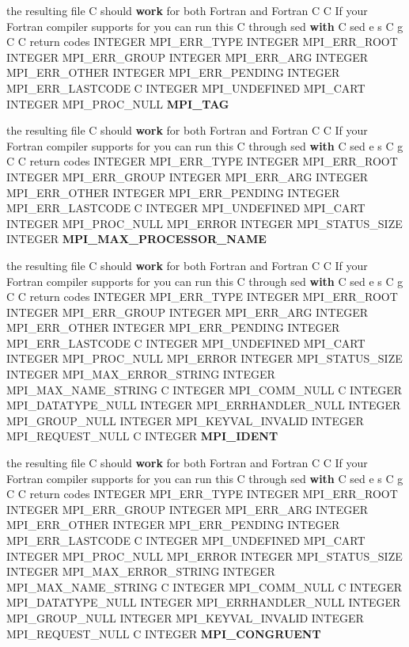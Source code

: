 \begin{CompactItemize}
\item 
the resulting file C should {\bf work} for both Fortran and Fortran C C If your Fortran compiler supports for you can run this C through sed {\bf with} C sed e s C g C C return codes INTEGER MPI\_\-ERR\_\-TYPE INTEGER MPI\_\-ERR\_\-ROOT INTEGER MPI\_\-ERR\_\-GROUP INTEGER MPI\_\-ERR\_\-ARG INTEGER MPI\_\-ERR\_\-OTHER INTEGER MPI\_\-ERR\_\-PENDING INTEGER MPI\_\-ERR\_\-LASTCODE C INTEGER MPI\_\-UNDEFINED MPI\_\-CART INTEGER MPI\_\-PROC\_\-NULL {\bf MPI\_\-TAG}
\item 
the resulting file C should {\bf work} for both Fortran and Fortran C C If your Fortran compiler supports for you can run this C through sed {\bf with} C sed e s C g C C return codes INTEGER MPI\_\-ERR\_\-TYPE INTEGER MPI\_\-ERR\_\-ROOT INTEGER MPI\_\-ERR\_\-GROUP INTEGER MPI\_\-ERR\_\-ARG INTEGER MPI\_\-ERR\_\-OTHER INTEGER MPI\_\-ERR\_\-PENDING INTEGER MPI\_\-ERR\_\-LASTCODE C INTEGER MPI\_\-UNDEFINED MPI\_\-CART INTEGER MPI\_\-PROC\_\-NULL MPI\_\-ERROR INTEGER MPI\_\-STATUS\_\-SIZE INTEGER {\bf MPI\_\-MAX\_\-PROCESSOR\_\-NAME}
\item 
the resulting file C should {\bf work} for both Fortran and Fortran C C If your Fortran compiler supports for you can run this C through sed {\bf with} C sed e s C g C C return codes INTEGER MPI\_\-ERR\_\-TYPE INTEGER MPI\_\-ERR\_\-ROOT INTEGER MPI\_\-ERR\_\-GROUP INTEGER MPI\_\-ERR\_\-ARG INTEGER MPI\_\-ERR\_\-OTHER INTEGER MPI\_\-ERR\_\-PENDING INTEGER MPI\_\-ERR\_\-LASTCODE C INTEGER MPI\_\-UNDEFINED MPI\_\-CART INTEGER MPI\_\-PROC\_\-NULL MPI\_\-ERROR INTEGER MPI\_\-STATUS\_\-SIZE INTEGER MPI\_\-MAX\_\-ERROR\_\-STRING INTEGER MPI\_\-MAX\_\-NAME\_\-STRING C INTEGER MPI\_\-COMM\_\-NULL C INTEGER MPI\_\-DATATYPE\_\-NULL INTEGER MPI\_\-ERRHANDLER\_\-NULL INTEGER MPI\_\-GROUP\_\-NULL INTEGER MPI\_\-KEYVAL\_\-INVALID INTEGER MPI\_\-REQUEST\_\-NULL C INTEGER {\bf MPI\_\-IDENT}
\item 
the resulting file C should {\bf work} for both Fortran and Fortran C C If your Fortran compiler supports for you can run this C through sed {\bf with} C sed e s C g C C return codes INTEGER MPI\_\-ERR\_\-TYPE INTEGER MPI\_\-ERR\_\-ROOT INTEGER MPI\_\-ERR\_\-GROUP INTEGER MPI\_\-ERR\_\-ARG INTEGER MPI\_\-ERR\_\-OTHER INTEGER MPI\_\-ERR\_\-PENDING INTEGER MPI\_\-ERR\_\-LASTCODE C INTEGER MPI\_\-UNDEFINED MPI\_\-CART INTEGER MPI\_\-PROC\_\-NULL MPI\_\-ERROR INTEGER MPI\_\-STATUS\_\-SIZE INTEGER MPI\_\-MAX\_\-ERROR\_\-STRING INTEGER MPI\_\-MAX\_\-NAME\_\-STRING C INTEGER MPI\_\-COMM\_\-NULL C INTEGER MPI\_\-DATATYPE\_\-NULL INTEGER MPI\_\-ERRHANDLER\_\-NULL INTEGER MPI\_\-GROUP\_\-NULL INTEGER MPI\_\-KEYVAL\_\-INVALID INTEGER MPI\_\-REQUEST\_\-NULL C INTEGER {\bf MPI\_\-CONGRUENT}

\end{CompactItemize}
